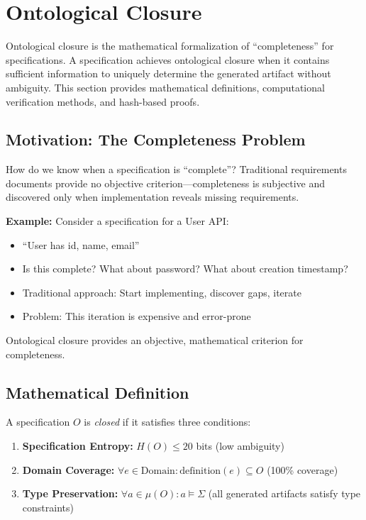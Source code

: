 \section{Ontological Closure}

Ontological closure is the mathematical formalization of ``completeness'' for specifications. A specification achieves ontological closure when it contains sufficient information to uniquely determine the generated artifact without ambiguity. This section provides mathematical definitions, computational verification methods, and hash-based proofs.

\subsection{Motivation: The Completeness Problem}

How do we know when a specification is ``complete''? Traditional requirements documents provide no objective criterion---completeness is subjective and discovered only when implementation reveals missing requirements.

\textbf{Example:} Consider a specification for a User API:
\begin{itemize}
    \item ``User has id, name, email''
    \item Is this complete? What about password? What about creation timestamp?
    \item Traditional approach: Start implementing, discover gaps, iterate
    \item Problem: This iteration is expensive and error-prone
\end{itemize}

Ontological closure provides an objective, mathematical criterion for completeness.

\subsection{Mathematical Definition}

\begin{definition}
    A specification \(O\) is \textit{closed} if it satisfies three conditions:
    \begin{enumerate}
        \item \textbf{Specification Entropy:} \(H(O) \leq 20\) bits (low ambiguity)
        \item \textbf{Domain Coverage:} \(\forall e \in \text{Domain}: \text{definition}(e) \subseteq O\) (100\% coverage)
        \item \textbf{Type Preservation:} \(\forall a \in \mu(O): a \models \Sigma\) (all generated artifacts satisfy type constraints)
    \end{enumerate}
\end{definition}

